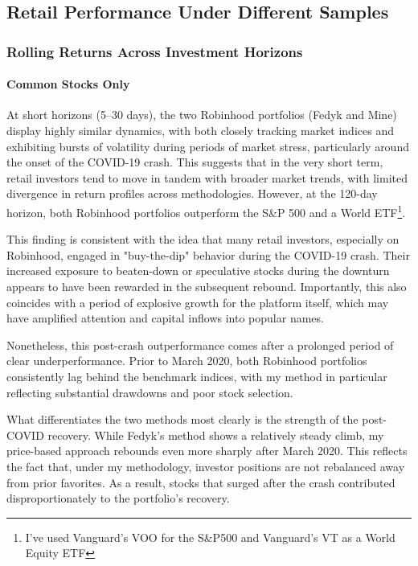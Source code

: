 \subsection{Retail Performance Under Different Samples}\label{diff_samples}




\subsubsection{Rolling Returns Across Investment Horizons}
\paragraph{Common Stocks Only}
At short horizons (5–30 days), the two Robinhood portfolios (Fedyk and Mine) display highly similar dynamics, with both closely tracking market indices and exhibiting bursts of volatility during periods of market stress, particularly around the onset of the COVID-19 crash. 
This suggests that in the very short term, retail investors tend to move in tandem with broader market trends, with limited divergence in return profiles across methodologies.
However, at the 120-day horizon, both Robinhood portfolios outperform the S\&P 500 and a World ETF\footnote{I've used Vanguard's VOO for the S\&P500 and Vanguard's VT as a World Equity ETF}. 

This finding is consistent with the idea that many retail investors, especially on Robinhood, engaged in "buy-the-dip" behavior during the COVID-19 crash. 
Their increased exposure to beaten-down or speculative stocks during the downturn appears to have been rewarded in the subsequent rebound. 
Importantly, this also coincides with a period of explosive growth for the platform itself, which may have amplified attention and capital inflows into popular names.

Nonetheless, this post-crash outperformance comes after a prolonged period of clear underperformance. 
Prior to March 2020, both Robinhood portfolios consistently lag behind the benchmark indices, with my method in particular reflecting substantial drawdowns and poor stock selection.

What differentiates the two methods most clearly is the strength of the post-COVID recovery. 
While Fedyk’s method shows a relatively steady climb, my price-based approach rebounds even more sharply after March 2020. 
This reflects the fact that, under my methodology, investor positions are not rebalanced away from prior favorites. 
As a result, stocks that surged after the crash contributed disproportionately to the portfolio’s recovery. 

